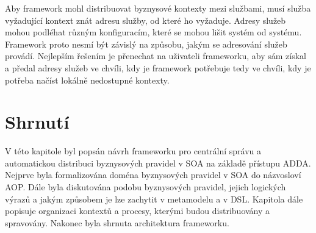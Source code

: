 Aby framework mohl distribuovat byznysové kontexty mezi službami, musí služba vyžadující kontext
znát adresu služby, od které ho vyžaduje. Adresy služeb mohou podléhat různým konfiguracím,
které se mohou lišit systém od systému. Framework proto nesmí být závislý na způsobu,
jakým se adresování služeb provádí. Nejlepším řešením je přenechat na uživateli frameworku, aby sám
získal a předal adresy služeb ve chvíli, kdy je framework potřebuje \textendash\xspace tedy
ve chvíli, kdy je potřeba načíst lokálně nedostupné kontexty.

\section{Shrnutí}

V této kapitole byl popsán návrh frameworku pro centrální správu a automatickou distribuci
byznysových pravidel v \gls{SOA} na základě přístupu \gls{ADDA}. Nejprve byla formalizována
doména byznysových pravidel v \gls{SOA} do názvosloví \gls{AOP}. Dále byla diskutována podobu byznysových pravidel,
jejich logických výrazů a jakým způsobem je lze zachytit v metamodelu a v \gls{DSL}.
Kapitola dále popisuje organizaci kontextů a procesy, kterými budou distribuovány a spravovány.
Nakonec byla shrnuta architektura frameworku.

